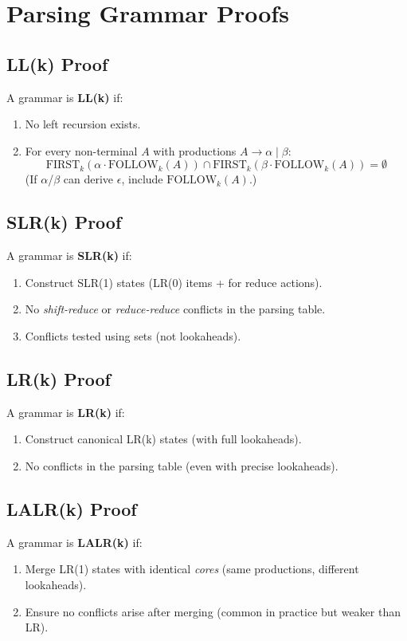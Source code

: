 \section{Parsing Grammar Proofs}

\subsection{LL(k) Proof}
A grammar is \textbf{LL(k)} if:
\begin{enumerate}
  \item No left recursion exists.
  \item For every non-terminal \(A\) with productions \(A \to \alpha \mid \beta\):
  \[
  \text{FIRST}_k(\alpha \cdot \text{FOLLOW}_k(A)) \cap \text{FIRST}_k(\beta \cdot \text{FOLLOW}_k(A)) = \emptyset
  \]
  (If \(\alpha\)/\(\beta\) can derive \(\epsilon\), include \(\text{FOLLOW}_k(A)\).)
\end{enumerate}

\subsection{SLR(k) Proof}
A grammar is \textbf{SLR(k)} if:
\begin{enumerate}
  \item Construct SLR(1) states (LR(0) items +  for reduce actions).
  \item No \textit{shift-reduce} or \textit{reduce-reduce} conflicts in the parsing table.
  \item Conflicts tested using  sets (not lookaheads).
\end{enumerate}

\subsection{LR(k) Proof}
A grammar is \textbf{LR(k)} if:
\begin{enumerate}
  \item Construct canonical LR(k) states (with full lookaheads).
  \item No conflicts in the parsing table (even with precise lookaheads).
\end{enumerate}

\subsection{LALR(k) Proof}
A grammar is \textbf{LALR(k)} if:
\begin{enumerate}
  \item Merge LR(1) states with identical \textit{cores} (same productions, different lookaheads).
  \item Ensure no conflicts arise after merging (common in practice but weaker than LR).
\end{enumerate}


